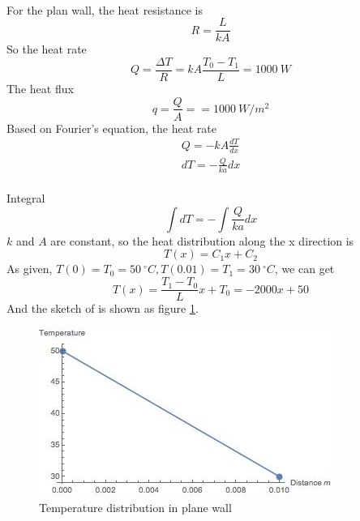 \begin{solution}
~\\
For the plan wall, the heat resistance is
$$R=\frac{L}{kA}$$
So the heat rate 
$$
Q=\frac{\Delta T}{R}=kA\frac{T_0-T_1}{L}=1000~W
$$
The heat flux$$q=\frac{Q}{A}==1000~W/m^2$$
Based on Fourier’s equation, the heat rate
\begin{eqnarray*}
Q=-kA\frac{dT}{dx}\\
dT=-\frac{Q}{ka}dx
\end{eqnarray*}
~\\
Integral
$$\int dT=-\int \frac{Q}{ka} dx$$
$k$ and $A$ are constant, so the heat distribution along the x direction is
$$T(x)=C_1x+C_2$$
As given, $T(0)=T_0=50~^\circ C, T(0.01)=T_1=30~^\circ C$, we can get
$$T(x)=\frac{T_1-T_0}{L}x+T_0=-2000x+50$$
And the sketch of  is shown as figure \ref{fig:2:2}.

\begin{figure}[h!]
  \centering
    \includegraphics[scale=1]{figures/ch2/2}
    \caption{Temperature distribution in plane wall}
    \label{fig:2:2}
\end{figure}
\end{solution}

